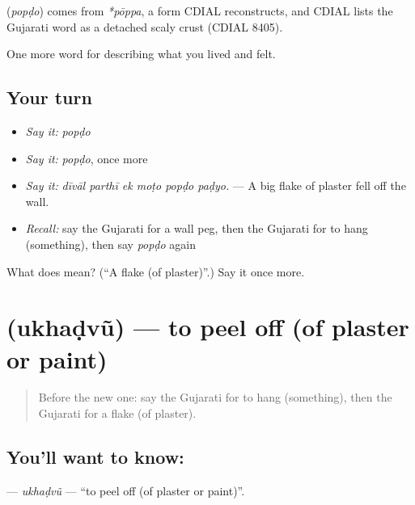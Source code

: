 \begin{cousinweb}
\textbf{} (\emph{popḍo}) comes from \emph{*pōppa}, a form CDIAL reconstructs, and CDIAL lists the Gujarati word as a detached scaly crust (CDIAL 8405).
\end{cousinweb}

\begin{grammarlens}[title={What you've built}]
One more word for describing what you lived and felt.
\end{grammarlens}

\subsection*{Your turn}
\begin{itemize}
\raggedright
  \item \emph{Say it:} \emph{popḍo}
  \item \emph{Say it:} \emph{popḍo}, once more
  \item \emph{Say it:} \emph{dīvāl parthī ek moṭo popḍo paḍyo.} — A big flake of plaster fell off the wall.
  \item \emph{Recall:} say the Gujarati for a wall peg, then the Gujarati for to hang (something), then say \emph{popḍo} again
\end{itemize}

\begin{tcolorbox}[breakable,colback=teal!4,colframe=teal!35!black,title={Before you move on}]
What does  mean? (\textquotedblleft{}A flake (of plaster)\textquotedblright{}.) Say it once more.
\end{tcolorbox}
\section[\texorpdfstring{\gu{ઉખડવું} (ukhaḍvũ)}{ઉખડવું (ukhaḍvũ)}]{ (ukhaḍvũ) — to peel off (of plaster or paint)}

\label{lesson:GU-C515-ukhadvu}



\begin{quote}
Before the new one: say the Gujarati for to hang (something), then the Gujarati for a flake (of plaster).
\end{quote}

\subsection*{You'll want to know: }
\textbf{} — \emph{ukhaḍvũ} — \textquotedblleft{}to peel off (of plaster or paint)\textquotedblright{}.

